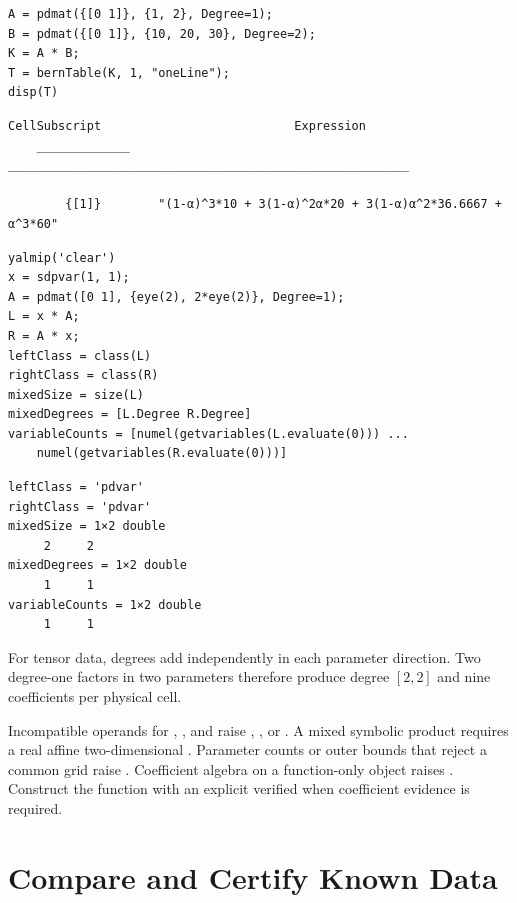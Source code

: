 \examplehead
\begin{lstlisting}[style=dpmatlab]
A = pdmat({[0 1]}, {1, 2}, Degree=1);
B = pdmat({[0 1]}, {10, 20, 30}, Degree=2);
K = A * B;
T = bernTable(K, 1, "oneLine");
disp(T)
\end{lstlisting}

\begin{lstlisting}[style=dpoutput]
    CellSubscript                           Expression
    _____________    ________________________________________________________

        {[1]}        "(1-α)^3*10 + 3(1-α)^2α*20 + 3(1-α)α^2*36.6667 + α^3*60"
\end{lstlisting}

\begin{lstlisting}[style=dpmatlab]
yalmip('clear')
x = sdpvar(1, 1);
A = pdmat([0 1], {eye(2), 2*eye(2)}, Degree=1);
L = x * A;
R = A * x;
leftClass = class(L)
rightClass = class(R)
mixedSize = size(L)
mixedDegrees = [L.Degree R.Degree]
variableCounts = [numel(getvariables(L.evaluate(0))) ...
    numel(getvariables(R.evaluate(0)))]
\end{lstlisting}

\begin{lstlisting}[style=dpoutput]
leftClass = 'pdvar'
rightClass = 'pdvar'
mixedSize = 1×2 double
     2     2
mixedDegrees = 1×2 double
     1     1
variableCounts = 1×2 double
     1     1
\end{lstlisting}

For tensor data, degrees add independently in each parameter direction. Two degree-one factors in two parameters therefore produce degree $[2,2]$ and nine coefficients per physical cell.

\remarkshead
Incompatible operands for \code{+}, \code{-}, and \code{*} raise , , or . A mixed symbolic product requires a real affine two-dimensional . Parameter counts or outer bounds that reject a common grid raise . Coefficient algebra on a function-only object raises \allowbreak{}%
  \allowbreak{}. Construct the function with an explicit verified  when coefficient evidence is required.

\section{Compare and Certify Known Data}
\label{sec:pdmat-comparison}

